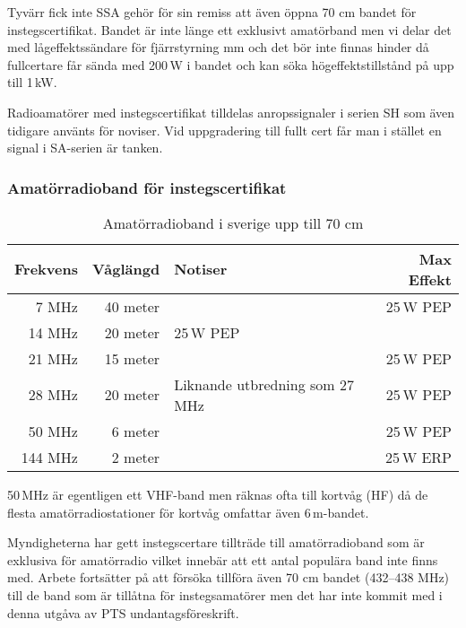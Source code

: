 Tyvärr fick inte SSA gehör för sin remiss att även öppna 70 cm bandet
för instegscertifikat. Bandet är inte länge ett exklusivt amatörband
men vi delar det med lågeffektssändare för fjärrstyrning mm och det
bör inte finnas hinder då fullcertare får sända med 200\,W i bandet och
kan söka högeffektstillstånd på upp till 1\,kW.

Radioamatörer med instegscertifikat tilldelas anropssignaler i serien SH
som även tidigare använts för noviser. Vid uppgradering till fullt cert
får man i stället en signal i SA-serien är tanken.

\subsubsection{Amatörradioband för instegscertifikat}

\begin{table}[H]
\centering
\begin{tabular}{rrlr}
	\textbf{Frekvens} & \textbf{Våglängd} & \textbf{Notiser}               & \textbf{Max Effekt} \\ \hline
	            7 MHz &          40 meter &                                &           25\,W PEP \\
	           14 MHz &          20 meter & 25\,W PEP                      &                     \\
	           21 MHz &          15 meter &                                &           25\,W PEP \\
	           28 MHz &          20 meter & Liknande utbredning som 27 MHz &           25\,W PEP \\
	           50 MHz &           6 meter &                                &           25\,W PEP \\ \hline
	          144 MHz &           2 meter &                                &           25\,W ERP
\end{tabular}
\caption{Amatörradioband i sverige upp till 70 cm}
\end{table}

50\,MHz är egentligen ett VHF-band men räknas ofta till kortvåg (HF)
då de flesta amatörradiostationer för kortvåg omfattar även 6\,m-bandet.

Myndigheterna har gett instegscertare tillträde till amatörradioband
som är exklusiva för amatörradio vilket innebär att ett antal populära
band inte finns med. Arbete fortsätter på att försöka tillföra även 70
cm bandet (432--438 MHz) till de band som är tillåtna för
instegsamatörer men det har inte kommit med i denna utgåva av PTS
undantagsföreskrift.

